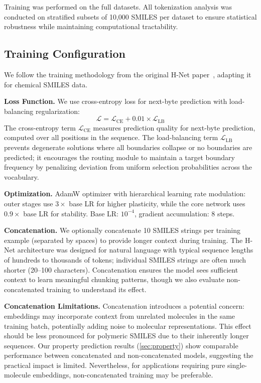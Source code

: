 \documentclass{article}
\newcommand{\hnet}{H-Net}
\begin{document}
Training was performed on the full datasets. All tokenization analysis was conducted on stratified subsets of 10,000 SMILES per dataset to ensure statistical robustness while maintaining computational tractability.



\subsection{Training Configuration}

We follow the training methodology from the original \hnet{} paper~\citep{hwang2025hnet}, adapting it for chemical SMILES data.

\textbf{Loss Function.} We use cross-entropy loss for next-byte prediction with load-balancing regularization:
\begin{equation}
\mathcal{L} = \mathcal{L}_{\text{CE}} + 0.01 \times \mathcal{L}_{\text{LB}}
\end{equation}
The cross-entropy term $\mathcal{L}_{\text{CE}}$ measures prediction quality for next-byte prediction, computed over all positions in the sequence. The load-balancing term $\mathcal{L}_{\text{LB}}$ prevents degenerate solutions where all boundaries collapse or no boundaries are predicted; it encourages the routing module to maintain a target boundary frequency by penalizing deviation from uniform selection probabilities across the vocabulary.

\textbf{Optimization.} AdamW optimizer with hierarchical learning rate modulation: outer stages use $3\times$ base LR for higher plasticity, while the core network uses $0.9\times$ base LR for stability. Base LR: $10^{-4}$, gradient accumulation: 8 steps.

\textbf{Concatenation.} We optionally concatenate 10 SMILES strings per training example (separated by spaces) to provide longer context during training. The \hnet{} architecture was designed for natural language with typical sequence lengths of hundreds to thousands of tokens; individual SMILES strings are often much shorter (20--100 characters). Concatenation ensures the model sees sufficient context to learn meaningful chunking patterns, though we also evaluate non-concatenated training to understand its effect.

\textbf{Concatenation Limitations.} Concatenation introduces a potential concern: embeddings may incorporate context from unrelated molecules in the same training batch, potentially adding noise to molecular representations. This effect should be less pronounced for polymeric SMILES due to their inherently longer sequences. Our property prediction results (\cref{sec:property}) show comparable performance between concatenated and non-concatenated models, suggesting the practical impact is limited. Nevertheless, for applications requiring pure single-molecule embeddings, non-concatenated training may be preferable.
\end{document}
